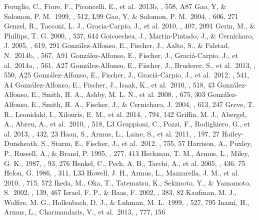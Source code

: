 \documentclass[preprint]{aastex}
\begin{document}
\begin{references}
 Feruglio, C., Fiore, F., Piconcelli, E., et al.~2013b, \aap, 558, A87
 Gao, Y, \& Solomon, P. M.~1999, \apj, 512, L99
 Gao, Y, \& Solomon, P. M.~2004, \apj, 606, 271
 Genzel, R., Tacconi, L. J., Gracia-Carpio, J., et al. 2010, \mnras, 407, 2091
 Gerin, M., \& Phillips, T. G. 2000, \apj, 537, 644
 Goicoechea, J., Mart\'in-Pintado, J., \& Cernicharo, J. 2005, \apj, 619, 291
 Gonz\'alez-Alfonso, E., Fischer, J., Aalto, S., \& Falstad, N.~2014b, \aap, 567, A91
 Gonz\'alez-Alfonso, E., Fischer, J., Graci\'a-Carpio, J., et al.~2014a, \aap, 561, A27
 Gonz\'alez-Alfonso, E., Fischer, J., Bruderer, S., et al.~2013, \aap, 550, A25
 Gonz\'alez-Alfonso, E., Fischer, J., Graci\'a-Carpio, J., et al.~2012, \aap, 541, A4
 Gonz\'alez-Alfonso, E., Fischer, J., Isaak, K., et al.~2010, \aap, 518, 43
 Gonz\'alez-Alfonso, E., Smith, H. A., Ashby, M. L. N., et al. 2008, \apj, 675, 303
 Gonz\'alez-Alfonso, E., Smith, H. A., Fischer, J., \& Cernicharo, J. 2004, \apj, 613, 247
 Greve, T. R., Leonidaki, I., Xilouris, E. M., et al. 2014, \apj, 794, 142
 Griffin, M. J., Abergel, A., Abreu, A., et al.~2010,  \aap, 518, L3
 Gruppioni, C., Pozzi, F., Rodighiero, G., et al. 2013, \mnras, 432, 23
 Haan, S., Armus, L., Laine, S., et al. 2011, \apjs, 197, 27
 Hailey-Dunsheath, S., Sturm, E., Fischer, J., et al.~2012, \apj, 755, 57
 Harrison, A., Puxley, P., Russell, A., \& Brand, P. 1995, \mnras, 277, 413
 Heckman, T. M., Armus, L., Miley, G. K., 1987, \aj, 93, 276
 Henkel, C., Peck, A. B., Tarchi, A., et al. 2005, \aap, 436, 75
 Helou, G. 1986, \apj, 311, L33
 Howell, J. H., Armus, L., Mazzarella, J. M., et al. 2010, \apj, 715, 572
 Ikeda, M., Oka, T., Tatematsu, K., Sekimoto, Y., \& Yamamoto, S.~2002, \apjs, 139, 467
 Israel, F. P., \& Baas, F. 2002, \aap, 383, 82
 Kaufman, M. J., Wolfire, M. G., Hollenbach, D. J., \& Luhman, M. L.~1999, \apj, 527, 795
 Inami, H., Armus, L., Charmandaris, V., et al.~2013, \apj, 777, 156 

\end{references}
\end{document}
